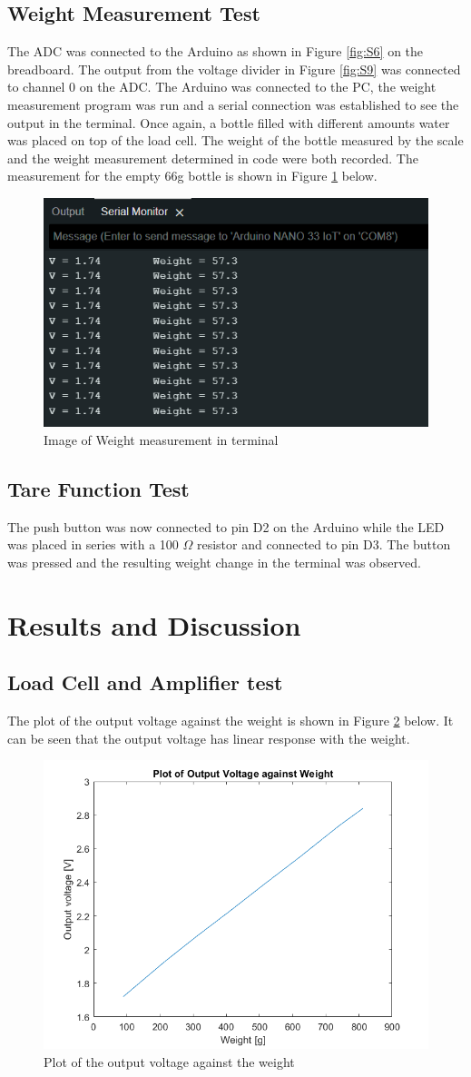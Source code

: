 \documentclass[class=report,11pt,crop=false]{standalone}
\begin{document}
	\subsection{Weight Measurement Test}
	The ADC was connected to the Arduino as shown in Figure \ref{fig:S6} on the breadboard. The output from the voltage divider in Figure \ref{fig:S9} was connected to channel 0 on the ADC. The Arduino was connected to the PC, the weight measurement program was run and a serial connection was established to see the output in the terminal. Once again, a bottle filled with different amounts water was placed on top of the load cell. The weight of the bottle measured by the scale and the weight measurement determined in code were both recorded. The measurement for the empty 66g bottle is shown in Figure \ref{fig:S17} below.
	\begin{figure}[h!]
		\centering
		\includegraphics[width=0.6\linewidth]{Figures/Weight Measurement.png}
		\caption{Image of Weight measurement in terminal}
		\label{fig:S17}
	\end{figure}
	
	\subsection{Tare Function Test}
	The push button was now connected to pin D2 on the Arduino while the LED was placed in series with a 100 $\Omega$ resistor and connected to pin D3. The button was pressed and the resulting weight change in the terminal was observed. 
	 
	\section{Results and Discussion}
	\subsection{Load Cell and Amplifier test}
	 The plot of the output voltage against the weight is shown in Figure \ref{fig:S18} below. It can be seen that the output voltage has linear response with the weight. 
	\begin{figure}[h!]
		\centering
		\includegraphics[width=0.4\linewidth]{Figures/Result2.png}
		\caption{Plot of the output voltage against the weight}
		\label{fig:S18}
	\end{figure}
	
\end{document}
